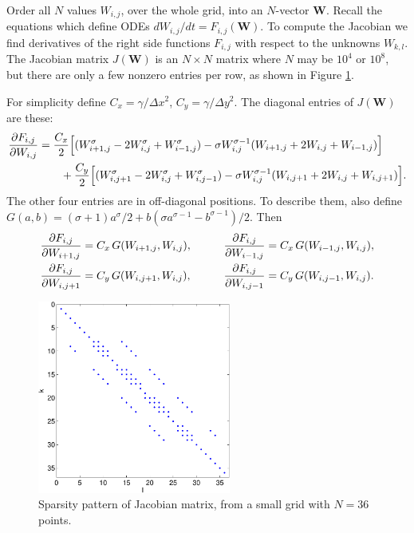 \documentclass[11pt]{amsart}
\newcommand{\bW}{\mathbf{W}}
\begin{document}
Order all $N$ values $W_{i,j}$, over the whole grid, into an $N$-vector $\bW$.  Recall the equations which define ODEs $dW_{i,j}/dt = F_{i,j}(\bW)$.  To compute the Jacobian we find derivatives of the right side functions $F_{i,j}$ with respect to the unknowns $W_{k,l}$.  The Jacobian matrix $J(\bW)$ is an $N\times N$ matrix where $N$ may be $10^4$ or $10^8$, but there are only a few nonzero entries per row, as shown in Figure \ref{fig:sparsity}. 

For simplicity define $C_x =\gamma/\Delta x^2$, $C_y = \gamma/\Delta y^2$.  The diagonal entries of $J(\bW)$ are these:
\begin{align} \label{eq:jacdiag}
\frac{\partial F_{i,j}}{\partial W_{i,j}} &= \frac{C_x}{2} \Big[(W_{i+1,j}^\sigma - 2 W_{i,j}^\sigma + W_{i-1,j}^\sigma) - \sigma  W_{i,j}^{\sigma-1} (W_{i+1,j} + 2 W_{i,j} + W_{i-1,j})\Big] \\
   &\qquad + \frac{C_y}{2} \Big[(W_{i,j+1}^\sigma - 2 W_{i,j}^\sigma + W_{i,j-1}^\sigma) - \sigma  W_{i,j}^{\sigma-1} (W_{i,j+1} + 2 W_{i,j} + W_{i,j+1})\Big]. \notag 
\end{align}
The other four entries are in off-diagonal positions.  To describe them, also define $G(a,b) = (\sigma+1) a^ \sigma/2 + b (\sigma a^{\sigma-1} - b^{\sigma-1})/2$.  Then
\begin{align} \label{eq:jacoffdiag}
\frac{\partial F_{i,j}}{\partial W_{i+1,j}} &= C_x\, G(W_{i+1,j},W_{i,j}), &\qquad
\frac{\partial F_{i,j}}{\partial W_{i-1,j}} &= C_x\, G(W_{i-1,j},W_{i,j}), \\
\frac{\partial F_{i,j}}{\partial W_{i,j+1}} &= C_y\, G(W_{i,j+1},W_{i,j}), &\qquad
\frac{\partial F_{i,j}}{\partial W_{i,j-1}} &= C_y\, G(W_{i,j-1},W_{i,j}). \notag
\end{align}

\begin{figure}[t]
\centering
\includegraphics[width=2.5in,keepaspectratio=true]{figs/sparsity.pdf}
\caption{Sparsity pattern of Jacobian matrix, from a small grid with $N=36$ points.}
\label{fig:sparsity}
\end{figure}
\end{document}
